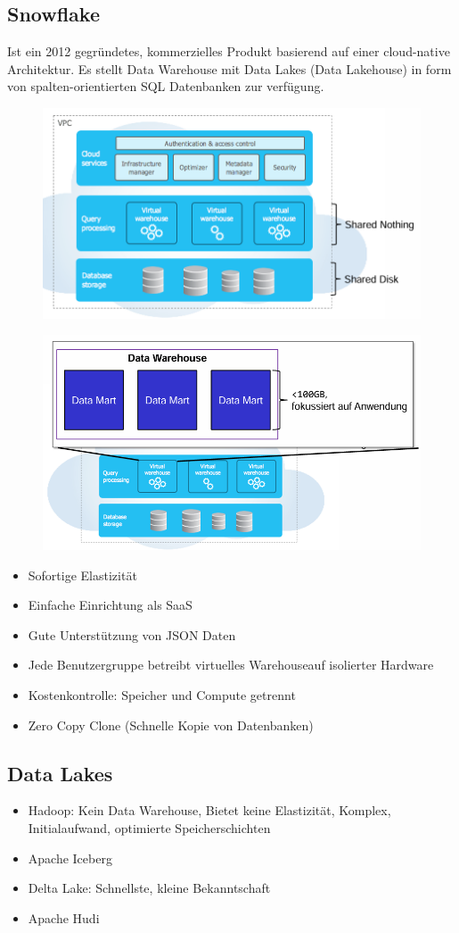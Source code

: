 \documentclass[../Main.tex]{subfiles}
\begin{document}
\subsection{Snowflake}
Ist ein 2012 gegründetes, kommerzielles Produkt basierend auf einer cloud-native Architektur.
Es stellt Data Warehouse mit Data Lakes (Data Lakehouse) in form von spalten-orientierten SQL Datenbanken zur verfügung.

\begin{figure}[H]
    \centering
    \includegraphics[width=0.5\linewidth]{Images/datan/snowflake-1.png}
\end{figure}
\begin{figure}[H]
    \centering
    \includegraphics[width=0.5\linewidth]{Images/datan/snowflake-2.png}
\end{figure}

\begin{itemize}
    \item Sofortige Elastizität
    \item Einfache Einrichtung als SaaS
    \item Gute Unterstützung von JSON Daten
    \item Jede Benutzergruppe betreibt virtuelles Warehouseauf isolierter Hardware
    \item Kostenkontrolle: Speicher und Compute getrennt
    \item Zero Copy Clone (Schnelle Kopie von Datenbanken)
\end{itemize}

\subsection{Data Lakes}
\begin{itemize}
    \item Hadoop: Kein Data Warehouse, Bietet keine Elastizität, Komplex, Initialaufwand, optimierte Speicherschichten
    \item Apache Iceberg
    \item Delta Lake: Schnellste, kleine Bekanntschaft
    \item Apache Hudi
\end{itemize}
\end{document}
